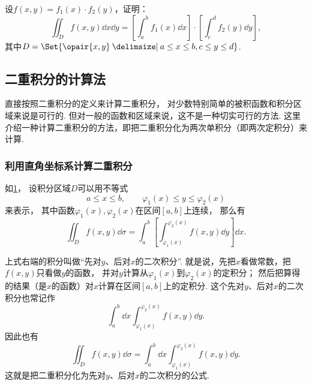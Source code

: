 \begin{example}
设\(f(x,y) = f_1(x) \cdot f_2(y)\)，证明：\[
\iint_D f(x,y) \dd{x} \dd{y}
= \left[ \int_a^b f_1(x) \dd{x} \right] \cdot \left[ \int_c^d f_2(y) \dd{y} \right],
\]其中\(D = \Set{\opair{x,y} \given a \leq x \leq b, c \leq y \leq d}\).
\end{example}

\subsection{二重积分的计算法}
直接按照二重积分的定义来计算二重积分，
对少数特别简单的被积函数和积分区域来说是可行的.
但对一般的函数和区域来说，这不是一种切实可行的方法.
这里介绍一种计算二重积分的方法，即把二重积分化为两次单积分（即两次定积分）来计算.

\subsubsection{利用直角坐标系计算二重积分}
如\cref{figure:二重积分.X型区域}，
设积分区域\(D\)可以用不等式
\[
	a \leq x \leq b, \qquad
	\varphi_1(x) \leq y \leq \varphi_2(x)
\]来表示，
其中函数\(\varphi_1(x),\varphi_2(x)\)在区间\([a,b]\)上连续，
那么有\[
	\iint_D f(x,y) \dd{\sigma}
	= \int_a^b \left[ \int_{\varphi_1(x)}^{\varphi_2(x)} f(x,y) \dd{y} \right] \dd{x}.
\]

上式右端的积分叫做“先对\(y\)、后对\(x\)的二次积分”.
就是说，先把\(x\)看做常数，把\(f(x,y)\)只看做\(y\)的函数，
并对\(y\)计算从\(\varphi_1(x)\)到\(\varphi_2(x)\)的定积分；
然后把算得的结果（是\(x\)的函数）对\(x\)计算在区间\([a,b]\)上的定积分.
这个先对\(y\)、后对\(x\)的二次积分也常记作\[
	\int_a^b \dd{x} \int_{\varphi_1(x)}^{\varphi_2(x)} f(x,y) \dd{y}.
\]
因此也有\[
	\iint_D f(x,y) \dd{\sigma}
	= \int_a^b \dd{x} \int_{\varphi_1(x)}^{\varphi_2(x)} f(x,y) \dd{y}.
\]
这就是把二重积分化为先对\(y\)、后对\(x\)的二次积分的公式.

\begin{figure}[ht]
	\centering
	\caption{}
	\label{figure:二重积分.X型区域}
\end{figure}

